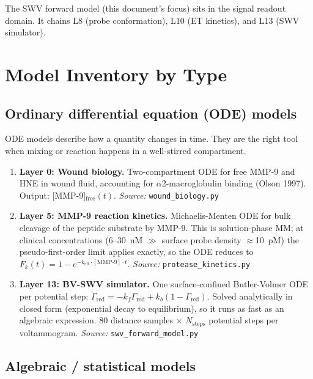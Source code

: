 \documentclass[10pt,a4paper]{article}
\numberwithin{equation}{section}
\begin{document}
The SWV forward model (this document's focus) sits in the signal readout domain.
It chains L8 (probe conformation), L10 (ET kinetics), and L13 (SWV simulator).

\section{Model Inventory by Type}

\subsection{Ordinary differential equation (ODE) models}

ODE models describe how a quantity changes in time. They are the right tool
when mixing or reaction happens in a well-stirred compartment.

\begin{enumerate}[label=\textbf{\arabic*.},leftmargin=*]
  \item \textbf{Layer 0: Wound biology.}
    Two-compartment ODE for free MMP-9 and HNE in wound fluid, accounting for
    $\alpha$2-macroglobulin binding (Olson 1997). Output: [MMP-9]$_{\text{free}}(t)$.
    \emph{Source:} \texttt{wound\_biology.py}

  \item \textbf{Layer 5: MMP-9 reaction kinetics.}
    Michaelis-Menten ODE for bulk cleavage of the peptide substrate by MMP-9.
    This is solution-phase MM; at clinical concentrations (6--30~nM $\gg$
    surface probe density $\approx$10~pM) the pseudo-first-order limit applies
    exactly, so the ODE reduces to $F_k(t) = 1 - e^{-k_{\text{eff}} \cdot [\text{MMP-9}] \cdot t}$.
    \emph{Source:} \texttt{protease\_kinetics.py}

  \item \textbf{Layer 13: BV-SWV simulator.}
    One surface-confined Butler-Volmer ODE per potential step:
    $\dot{\Gamma}_{\text{red}} = -k_f \Gamma_{\text{red}} + k_b (1-\Gamma_{\text{red}})$.
    Solved analytically in closed form (exponential decay to equilibrium), so it
    runs as fast as an algebraic expression. 80 distance samples $\times$ $N_{\text{steps}}$
    potential steps per voltammogram.
    \emph{Source:} \texttt{swv\_forward\_model.py}
\end{enumerate}

\subsection{Algebraic / statistical models}
\end{document}
